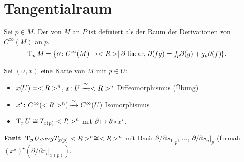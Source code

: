\section{Tangentialraum}
\begin{definition}
	Sei $p\in M$. Der  von $M$ an $P$ ist definiert als der Raum der Derivationen von $C^\infty(M)$ an $p$. \begin{align*}
		\operatorname{T}_p M = \{\partial \colon C^\infty(M)\to<R>\mid\partial\;\text{linear},\,\partial(fg) = f_p\partial(g)+g_p\partial(f)\}.
	\end{align*}
\end{definition}

Sei $(U,x)$ eine Karte von $M$ mit $p\in U$:\begin{itemize}[label={$\Rightarrow$}]
	\item $x(U)=<R>^n$, $x\colon U\xrightarrow\cong <R>^n$ Diffeomorphismus (Übung)
	\item $x^\star\colon C^\infty(<R>^n)\xrightarrow\cong C^\infty(U)$ Isomorphismus
	\item $\operatorname{T}_p U\cong T_{x(p)} <R>^n$ mit $\partial\mapsto\partial\circ x^\star$.
\end{itemize}

\textbf{Fazit}: $\operatorname{T}_p Ucong T_{x(p)} <R>^n\cong <R>^n$ mit Basis $\partial\slash\partial x_1\Big|_p$, $\dots$, $\partial\slash\partial x_n\big|_p$ (formal:  $(x^\star)^\star(\partial\slash\partial x_i\big|_{x(p)})$.

